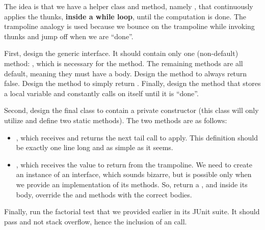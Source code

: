 The idea is that we have a helper class and method, namely , that continuously applies the thunks, \textbf{inside a while loop}, until the computation is done. The trampoline analogy is used because we bounce on the trampoline while invoking thunks and jump off when we are ``done''.

First, design the generic  interface. It should contain only one (non-default) method: , which is necessary for the  method. The remaining methods are all default, meaning they must have a body. Design the  method to always return false. Design the  method to simply return . Finally, design the  method that stores a local variable and constantly calls  on itself until it is ``done''. 

Second, design the  final class to contain a private constructor (this class will only utilize and define two static methods). The two methods are as follows:

\begin{itemize}
  \item {}, which receives and returns the next tail call to apply. This definition should be exactly one line long and as simple as it seems.
  \item {}, which receives the value to return from the trampoline. We need to create an instance of an interface, which sounds bizarre, but is possible only when we provide an implementation of its methods. So, return a , and inside its body, override the  and  methods with the correct bodies.
\end{itemize}

Finally, run the factorial test that we provided earlier in its JUnit suite. It should pass and not stack overflow, hence the inclusion of an  call.


